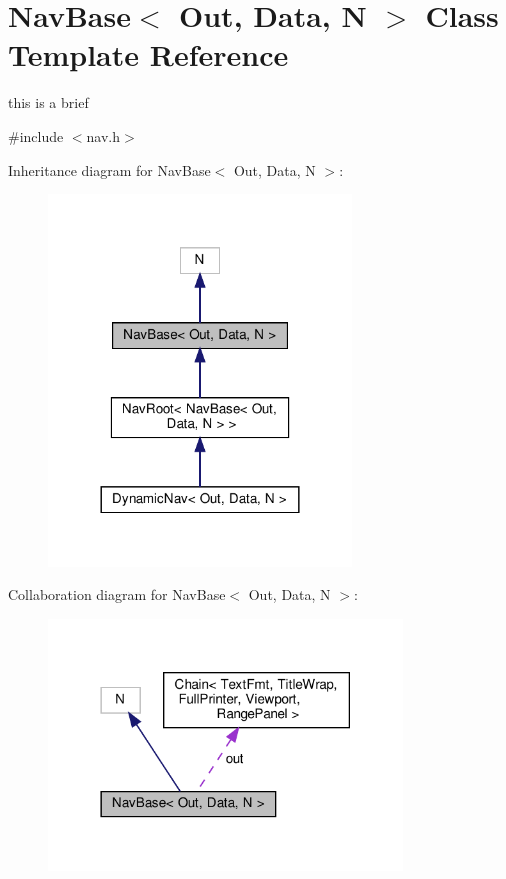 \hypertarget{classNavBase}{}\section{Nav\+Base$<$ Out, Data, N $>$ Class Template Reference}
\label{classNavBase}


this is a brief  




{\ttfamily \#include $<$nav.\+h$>$}



Inheritance diagram for Nav\+Base$<$ Out, Data, N $>$\+:\nopagebreak
\begin{figure}[H]
\begin{center}
\leavevmode
\includegraphics[width=228pt]{classNavBase__inherit__graph}
\end{center}
\end{figure}


Collaboration diagram for Nav\+Base$<$ Out, Data, N $>$\+:\nopagebreak
\begin{figure}[H]
\begin{center}
\leavevmode
\includegraphics[width=266pt]{classNavBase__coll__graph}
\end{center}
\end{figure}
